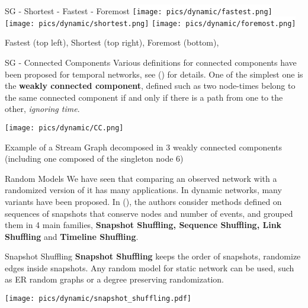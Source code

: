 \begin{textbox}{SG - Shortest - Fastest - Foremost}
    \centering
    \colorbox{white}{\texttt{[image: pics/dynamic/fastest.png]}}
    \colorbox{white}{\texttt{[image: pics/dynamic/shortest.png]}}
    \colorbox{white}{\texttt{[image: pics/dynamic/foremost.png]}}

    Fastest (top left),  Shortest (top right), Foremost (bottom),
\end{textbox}


\begin{textbox}{SG - Connected Components}
    Various definitions for connected components have been proposed for temporal networks, see  (\cite{latapy2018stream}) for details. One of the simplest one is the \textbf{weakly connected component}, defined such as two node-times belong to the same connected component if and only if there is a path from one to the other, \textit{ignoring time}.

    \centering
    \colorbox{white}{\texttt{[image: pics/dynamic/CC.png]}}

    Example of a Stream Graph decomposed in 3 weakly connected components (including one composed of the singleton node 6)
\end{textbox}


\begin{textbox}{Random Models}
    We have seen that comparing an observed network with a randomized version of it has many applications. In dynamic networks, many variants have been proposed. In (\cite{gauvin2022}), the authors consider methods defined on sequences of snapshots that conserve nodes and number of events, and grouped them in 4 main families, \textbf{Snapshot Shuffling, Sequence Shuffling, Link Shuffling} and \textbf{Timeline Shuffling}.
\end{textbox}


\begin{textbox}{Snapshot Shuffling}
    \textbf{Snapshot Shuffling} keeps the order of snapshots, randomize edges inside snapshots. Any random model for static network can be used, such as ER random graphs or a degree preserving randomization.

    \centering
    \colorbox{white}{\texttt{[image: pics/dynamic/snapshot\_shuffling.pdf]}}
\end{textbox}


